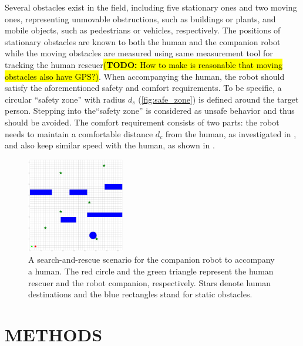 \documentclass[letterpaper, 10 pt, conference]{ieeeconf}
\newcommand{\todohere}[1]{\hl{(\textbf{TODO:} #1)}}
\begin{document}
	Several obstacles exist in the field, including five stationary ones and two moving ones, representing unmovable obstructions, such as buildings or plants, and mobile objects, such as pedestrians or vehicles, respectively.
	The positions of stationary obstacles are known to both the human and the companion robot while the moving obstacles are measured using same measurement tool for tracking the human rescuer\todohere{How to make is reasonable that moving obstacles also have GPS?}.
	When accompanying the human, the robot should satisfy the aforementioned safety and comfort requirements.
	To be specific, a circular ``safety zone'' with radius $d_s$ (\cref{fig:safe_zone}) is defined around the target person.
	Stepping into the``safety zone'' is considered as unsafe behavior and thus should be avoided.
	The comfort requirement consists of two parts: the robot needs to maintain a comfortable distance $d_c$ from the human, as investigated in \cite{hall1968proxemics}, and also keep similar speed with the human, as shown in \cite{ref}.
	
	
	\begin{figure}
		\centering		
		\includegraphics[width=0.38\textwidth]{figures/sim_traj_init}		
		\caption{A search-and-rescue scenario for the companion robot to accompany a human. The red circle and the green triangle represent the human rescuer and the robot companion, respectively. Stars denote human destinations and the blue rectangles stand for static obstacles.}
		\label{fig:ref_traj_init}
	\end{figure}
	
	
	\section{METHODS} \label{sec:framework}
	
\end{document}
